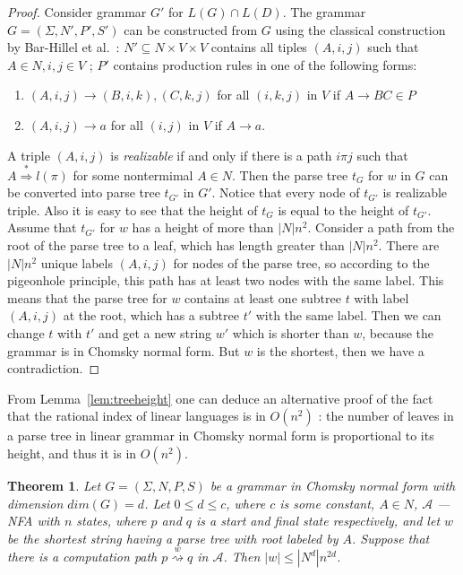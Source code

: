 \documentclass[11pt,a4paper]{article} %
\newcommand{\xra}[1]{\overset{#1}{\rightsquigarrow}}
\newtheorem{theorem}{Theorem}
\begin{document}
\begin{proof}
Consider grammar $G'$ for $L(G)\cap L(D)$. The grammar $G = (\Sigma, N', P', S')$ can be constructed from $G$ using the classical construction by Bar-Hillel et al.~\cite{BarHillel}: $N' \subseteq N \times V \times V $  contains all tiples $(A, i, j)$ such that $A \in N, i, j \in V$ ; $P'$ contains production rules in one of the following forms:
\begin{enumerate}
\item $(A, i, j) \rightarrow (B, i, k), (C, k, j)$ for all $(i, k, j)$ in $V$  if $A \rightarrow BC \in P$
\item $(A, i, j) \rightarrow a$ for all $(i, j)$ in $V$ if $A \rightarrow a$.
\end{enumerate}
A triple $(A, i, j)$ is \textit{realizable} if and only if there is a path $i\pi j$ such that $A \stackrel {*}{\Rightarrow } l(\pi)$ for some nontermimal $A \in N$. Then the parse tree $t_G$ for $w$ in $G$ can be converted into parse tree $t_{G'}$ in $G'$. Notice that every node of $t_{G'}$ is realizable triple. Also it is easy to see that the height of $t_G$ is equal to the height of $t_{G'}$. Assume that $t_{G'}$ for $w$ has a height of more than $|N|n^2$. Consider a path from the root of the parse tree to a leaf, which has length greater than $|N|n^2$. There are $|N|n^2$ unique labels $(A, i, j)$ for nodes of the parse tree, so according to the pigeonhole principle, this path has at least two nodes with the same label. This means that the parse tree for $w$ contains at least one subtree $t$ with label $(A, i, j)$ at the root, which has a subtree $t'$ with the same label. Then we can change $t$ with $t'$ and get a new string $w'$ which is shorter than $w$, because the grammar is in Chomsky normal form. But $w$ is the shortest, then we have a contradiction.
\end{proof}
From Lemma~\ref{lem:treeheight} one can deduce an alternative proof of the fact that the rational index of linear languages is in $O(n^2)$ \cite{RatBasic}: the number of leaves in a parse tree in linear grammar in Chomsky normal form is proportional to its height, and thus it is in $O(n^2)$.
\begin{theorem}
\label{oscbnddim}
Let $G = (\Sigma, N, P, S)$ be a grammar in Chomsky normal form with dimension $dim(G)=d$. Let $0 \leq d \leq c$, where $c$ is some constant, $A \in N$, $\mathcal{A}$ --- NFA with $n$ states, where $p$ and $q$ is a start and final state respectively, and let $w$ be the shortest string having a parse tree with root labeled by $A$. Suppose that there is a computation path $p \xra{w} q$ in $\mathcal{A}$. Then $|w| \leq |N^d|n^{2d}$.
\end{theorem}
\end{document}
